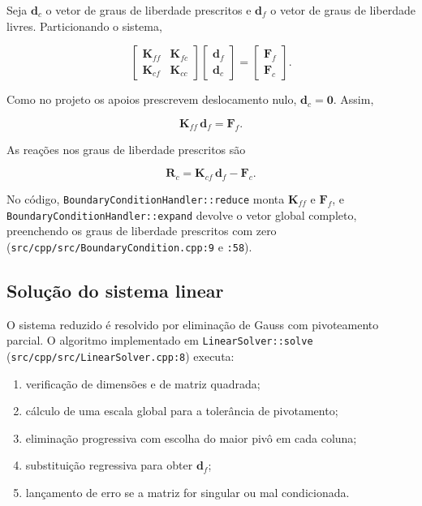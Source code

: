 \documentclass[12pt,a4paper]{article}
\begin{document}
Seja \(\mathbf{d}_c\) o vetor de graus de liberdade prescritos e \(\mathbf{d}_f\) o vetor de graus de liberdade livres. Particionando o sistema,

\begin{equation}
  \begin{bmatrix}
    \mathbf{K}_{ff} & \mathbf{K}_{fc}\\
    \mathbf{K}_{cf} & \mathbf{K}_{cc}
  \end{bmatrix}
  \begin{bmatrix}
    \mathbf{d}_f\\\mathbf{d}_c
  \end{bmatrix}
  =
  \begin{bmatrix}
    \mathbf{F}_f\\\mathbf{F}_c
  \end{bmatrix}.
  \label{eq:particao}
\end{equation}

Como no projeto os apoios prescrevem deslocamento nulo, \(\mathbf{d}_c=\mathbf{0}\). Assim,

\begin{equation}
  \mathbf{K}_{ff}\,\mathbf{d}_f = \mathbf{F}_f.
  \label{eq:reduzido}
\end{equation}

As reações nos graus de liberdade prescritos são

\begin{equation}
  \mathbf{R}_c = \mathbf{K}_{cf}\,\mathbf{d}_f - \mathbf{F}_c.
  \label{eq:reacoes}
\end{equation}

No código, \texttt{BoundaryConditionHandler::reduce} monta \(\mathbf{K}_{ff}\) e \(\mathbf{F}_f\), e \texttt{BoundaryConditionHandler::expand} devolve o vetor global completo, preenchendo os graus de liberdade prescritos com zero (\texttt{src/cpp/src/BoundaryCondition.cpp:9} e \texttt{:58}).

\subsection{Solução do sistema linear}
\label{sec:solver}

O sistema reduzido é resolvido por eliminação de Gauss com pivoteamento parcial. O algoritmo implementado em \texttt{LinearSolver::solve} (\texttt{src/cpp/src/LinearSolver.cpp:8}) executa:

\begin{enumerate}[leftmargin=1.5em]
  \item verificação de dimensões e de matriz quadrada;
  \item cálculo de uma escala global para a tolerância de pivotamento;
  \item eliminação progressiva com escolha do maior pivô em cada coluna;
  \item substituição regressiva para obter \(\mathbf{d}_f\);
  \item lançamento de erro se a matriz for singular ou mal condicionada.
\end{enumerate}
\end{document}
